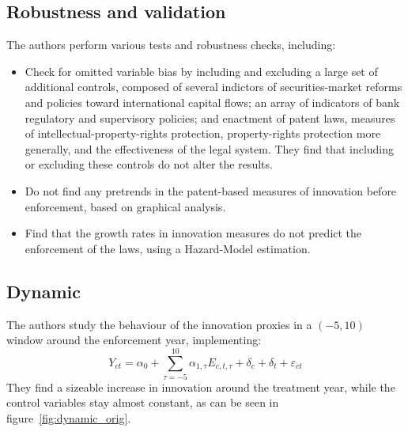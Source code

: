 \subsection{Robustness and validation}\label{subsec:robustness-and-validation}
The authors perform various tests and robustness checks, including:
\begin{itemize}
    \item Check for omitted variable bias by including and excluding a large set of additional controls, composed of several indictors of securities-market reforms and policies toward international capital flows; an array of indicators of bank
    regulatory and supervisory policies; and enactment of patent laws, measures of intellectual-property-rights protection, property-rights protection more generally, and the effectiveness of the legal system.
    They find that including or excluding these controls do not alter the results.
    \item Do not find any pretrends in the patent-based measures of innovation before enforcement, based on graphical analysis.
    \item Find that the growth rates in innovation measures do not predict the enforcement of the laws, using a Hazard-Model estimation.
\end{itemize}

\subsection{Dynamic}\label{subsec:dynamic}
The authors study the behaviour of the innovation proxies in a $(-5,10)$ window around the enforcement year, implementing:
\begin{equation}
    Y_{ct}  = \alpha_0 + \sum_{\tau=-5}^{10} \alpha_{1,\tau} E_{c,t,\tau} +\delta_c +\delta_t + \varepsilon_{ct}
\end{equation}
They find a sizeable increase in innovation around the treatment year, while the control variables stay almost constant, as can be seen in figure~\ref{fig:dynamic_orig}.

